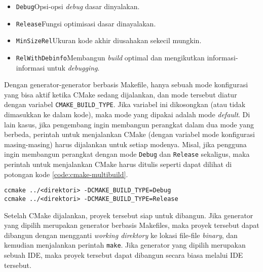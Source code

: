 \begin{enumerate}
\begin{itemize}
		\begin{itemize}
			\item \verb|Debug|\textemdash Opsi-opsi \textit{debug} dasar dinyalakan.
			\item \verb|Release|\textemdash Fungsi optimisasi dasar dinayalakan.
			\item \verb|MinSizeRel|\textemdash Ukuran kode akhir diusahakan sekecil mungkin.
			\item \verb|RelWithDebinfo|\textemdash Membangun \textit{build} optimal dan mengikutkan informasi-informasi untuk \textit{debugging}.
		\end{itemize}
		
		Dengan generator-generator berbasis Makefile, hanya sebuah mode konfigurasi yang bisa aktif ketika CMake sedang dijalankan, dan mode tersebut diatur dengan variabel \verb|CMAKE_BUILD_TYPE|. Jika variabel ini dikosongkan (atau tidak dimasukkan ke dalam kode), maka mode yang dipakai adalah mode \textit{default}. Di lain kasus, jika pengembang ingin membangun perangkat dalam dua mode yang berbeda, perintah untuk menjalankan CMake (dengan variabel mode konfigurasi masing-masing) harus dijalankan untuk setiap modenya. 
		Misal, jika pengguna ingin membangun perangkat dengan mode \verb|Debug| dan \verb|Release| sekaligus, maka perintah untuk menjalankan CMake harus ditulis seperti dapat dilihat di potongan kode \ref{code:cmake-multibuild}.
		
		\begin{lstlisting}[caption=Kode utama operasional CMakeLists, label=code:cmake-multibuild]
ccmake ../<direktori> -DCMAKE_BUILD_TYPE=Debug
ccmake ../<direktori> -DCMAKE_BUILD_TYPE=Release
		\end{lstlisting}
		
	\end{itemize}
	
	Setelah CMake dijalankan, proyek tersebut siap untuk dibangun. Jika generator yang dipilih merupakan generator berbasis Makefiles, maka proyek tersebut dapat dibangun dengan mengganti \textit{working direktory} ke lokasi file-file \textit{binary}, dan kemudian menjalankan perintah \verb|make|. Jika generator yang dipilih merupakan sebuah IDE, maka proyek tersebut dapat dibangun secara biasa melalui IDE tersebut.
\end{enumerate}